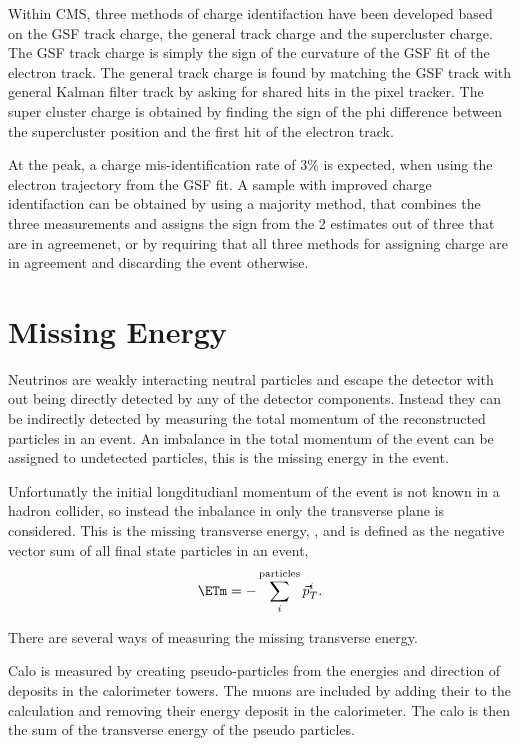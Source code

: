 Within CMS, three methods of charge identifaction have been developed based on
the GSF track charge, the general track charge and the supercluster charge. The
GSF track charge is simply the sign of the curvature of the GSF fit of the
electron track. The general track charge is found by matching the GSF track with
general Kalman filter track by asking for shared hits in the pixel tracker. 
The super cluster charge is obtained by finding the sign of the phi difference
between the supercluster position and the first hit of the electron track.

At the \PZ peak, a charge mis-identification rate of \unit{3}{\%} is expected,
when using the electron trajectory from the GSF fit.  A sample with improved
charge identifaction can be obtained by using a majority method, that combines
the three measurements and assigns the sign from the 2 estimates out of three
that are in agreemenet, or by requiring that all three methods for assigning
charge are in agreement and discarding the event otherwise.

\section{Missing Energy} 
Neutrinos are weakly interacting neutral particles and escape the
detector with out being directly detected by any of the detector components. 
Instead they can be indirectly detected by measuring the total momentum of the
reconstructed particles in an event.
An imbalance in the total momentum of the event can be assigned to undetected
particles, this is the missing energy in the event.

Unfortunatly the initial longditudianl momentum of the event is not known in a
hadron collider, so instead the inbalance in only the transverse plane is
considered. This is the missing transverse energy, \ETm, and is defined as
the negative vector sum of all final state particles in an event,
\begin{equation}
\ETm = -\sum_i^{\text{particles}} \vec{p}_{T}^{i}.
\end{equation}

There are several ways of measuring the missing transverse energy.

Calo \ETm is measured by creating pseudo-particles from the energies and
direction of deposits in the calorimeter towers. The muons are included by
adding their \Pt to the calculation and removing their energy deposit in the
calorimeter. The calo \ETm is then the sum of the transverse energy of the
pseudo particles.

